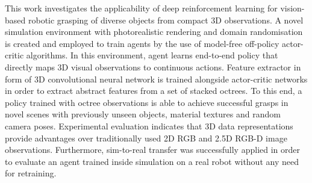 This work investigates the applicability of deep reinforcement learning for vision-based robotic grasping of diverse objects from compact 3D observations. A novel simulation environment with photorealistic rendering and domain randomisation is created and employed to train agents by the use of model-free off-policy actor-critic algorithms. In this environment, agent learns end-to-end policy that directly maps 3D visual observations to continuous actions. Feature extractor in form of 3D convolutional neural network is trained alongside actor-critic networks in order to extract abstract features from a set of stacked octrees. To this end, a policy trained with octree observations is able to achieve successful grasps in novel scenes with previously unseen objects, material textures and random camera poses. Experimental evaluation indicates that 3D data representations provide advantages over traditionally used 2D RGB and 2.5D RGB-D image observations. Furthermore, sim-to-real transfer was successfully applied in order to evaluate an agent trained inside simulation on a real robot without any need for retraining.
